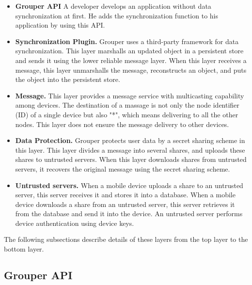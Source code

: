 \documentclass[twocolumn,10pt]{article}
\begin{document}
\begin{itemize}
	\setlength{\itemsep}{1pt}
	\setlength{\parskip}{0pt}
	\setlength{\parsep}{0pt}
	\item \textbf{Grouper API}
	A developer develops an application without data synchronization at first. 
	He adds the synchronization function to his application by using this API.
	\item \textbf{Synchronization Plugin.} 
	Grouper uses a third-party framework for data synchronization.
	This layer marshalls an updated object in a persistent store and sends it using the lower reliable message layer.
	When this layer receives a message, this layer unmarshalls the message, reconstructs an object, and puts the object into the persistent store.
	\item \textbf{Message.}
	This layer provides a message service with multicasting capability among devices.
	The destination of a massage is not only the node identifier (ID) of a single device but also "*", which means delivering to all the other nodes.
	This layer does not ensure the message delivery to other devices.
	\item \textbf{Data Protection.}
	Grouper protects user data by a secret sharing scheme in this layer.
	This layer divides a message into several shares, and uploads these shares to untrusted servers.
	When this layer downloads shares from untrusted servers, it recovers the original message using the secret sharing scheme.
	\item \textbf{Untrusted servers.}
	When a mobile device uploads a share to an untrusted server, this server receives it and stores it into a database.
	When a mobile device downloads a share from an untrusted server, this server retrieves it from the database and send it into the device.
	An untrusted server performs device authentication using device keys.
\end{itemize}

The following subsections describe details of these layers from the top layer to the bottom layer.

\subsection{Grouper API}
\end{document}
